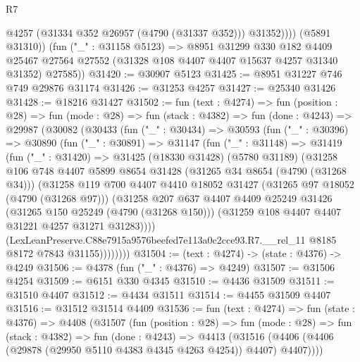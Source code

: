 \begin{lexlean}{R7}
\begin{coremodule}
                @4257
                (@31334 @352 @26957 (@4790 (@31337 @352)))
                @31352))))
        (@5891 @31310))
      (fun ("_" : @31158 @5123) =>
      @8951
        @31299
        @330
        @182
        @4409
        @25467
        @27564
        @27552
        (@31328 @108 @4407 @4407 @15637 @4257 @31340 @31352)
        @27585))
@31420 := @30907 @5123
@31425 := @8951 @31227 @746 @749 @29876 @31174
@31426 := @31253 @4257
@31427 := @25340 @31426
@31428 := @18216 @31427
@31502 := fun (text : @4274) =>
  fun (position : @28) =>
  fun (mode : @28) =>
  fun (stack : @4382) =>
  fun (done : @4243) =>
  @29987
    (@30082
      (@30433
        (fun ("_" : @30434) =>
        @30593
          (fun ("_" : @30396) =>
          @30890
            (fun ("_" : @30891) =>
            @31147
              (fun ("_" : @31148) =>
              @31419
                (fun ("_" : @31420) =>
                @31425
                  (@18330 @31428)
                  (@5780 @31189)
                  (@31258
                    @106
                    @748
                    @4407
                    @5899
                    @8654
                    @31428
                    (@31265 @34 @8654 (@4790 (@31268 @34)))
                    (@31258
                      @119
                      @700
                      @4407
                      @4410
                      @18052
                      @31427
                      (@31265 @97 @18052 (@4790 (@31268 @97)))
                      (@31258
                        @207
                        @637
                        @4407
                        @4409
                        @25249
                        @31426
                        (@31265 @150 @25249 (@4790 (@31268 @150)))
                        (@31259 @108 @4407 @4407 @31221 @4257 @31271 @31283))))
                  (LexLeanPreserve.C88e7915a9576beefed7e113a0c2cce93.R7.__rel_11
                    @8185
                    @8172
                    @7843
                    @31155))))))))
@31504 := (text : @4274) -> (state : @4376) -> @4249
@31506 := @4378 (fun ("_" : @4376) => @4249)
@31507 := @31506 @4254
@31509 := @6151 @330 @4345
@31510 := @4436 @31509
@31511 := @31510 @4407
@31512 := @4434 @31511
@31514 := @4455 @31509 @4407
@31516 := @31512 @31514 @4409
@31536 := fun (text : @4274) =>
  fun (state : @4376) =>
  @4408
    (@31507
      (fun (position : @28) =>
      fun (mode : @28) =>
      fun (stack : @4382) =>
      fun (done : @4243) =>
      @4413 (@31516 (@4406 (@4406 (@29878 (@29950 @5110 @4383 @4345 @4263 @4254)) @4407) @4407))))

\end{coremodule}
\end{lexlean}
